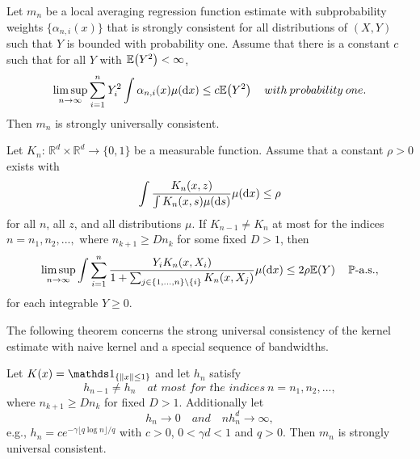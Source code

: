 \begin{lemma} \label{lemma23.3}%
Let $m_n$ be a local averaging regression function estimate with subprobability weights $\{\alpha_{n,i}(x)\}$ that is strongly consistent for all distributions of $(X,Y)$ such that $Y$ is bounded with probability one. Assume that there is a constant $c$ such that for all $Y$ with $\mathbb{E}\!\left(Y^2\right)<\infty$,
\[\limsup_{n \to \infty} \sum_{i=1}^{n}Y_i^2 \int \alpha_{n,i}(x) \mu(\diff{x}) \leq c\ev{Y^2} \quad with \: probability \: one.\]
Then $m_n$ is strongly universally consistent.
\end{lemma}

\begin{lemma} \label{lemma23.5} %
Let $K_n$: $\mathbb{R}^d \times \mathbb{R}^d \to \{0,1\}$ be a measurable function. Assume that a constant $\rho>0$ exists with
\[\int \frac{K_n(x,z)}{\int K_n(x,s) \mu(\diff{s})} \mu(\diff{x}) \leq \rho\]
for all $n$, all $z$, and all distributions $\mu$. If $K_{n-1} \neq K_n$ at most for the indices $n=n_1,n_2,...,$ where $n_{k+1} \geq Dn_k$ for some fixed $D>1$, then
\[\limsup_{n\to\infty} \int \sum_{i=1}^{n} \frac{Y_i K_n(x,X_i)}{1+\sum_{j\in\{1,...,n\}\setminus\{i\}} K_n(x,X_j)} \mu(\diff{x}) \leq 2\rho \ev{Y} \quad\mathbb{P}\text{-a.s.},\]
for each integrable $Y\geq0.$
\end{lemma}

The following theorem concerns the strong universal consistency of the kernel estimate with naive kernel and a special sequence of bandwidths.
\begin{theorem} \label{kernelsuc}
Let $K(x) = \ind{\{\|x\|\leq1\}}$ and let $h_n$ satisfy 
\[h_{n-1} \neq h_n \quad \textit{at most for the indices} \ n=n_1,n_2,...,\]
where $n_{k+1} \geq Dn_k$ for fixed $D>1$. Additionally let 
\[ h_n \to 0 \quad and \quad nh_n^d \to \infty,\]
e.g., $h_n = ce^{-\gamma \lfloor q \log n \rfloor/q}$ with $c>0$, $0<\gamma d<1$ and $q>0$. Then $m_n$ is strongly universal consistent.
\end{theorem}

